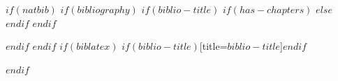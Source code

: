 $if(natbib)$
$if(bibliography)$
$if(biblio-title)$
$if(has-chapters)$
\renewcommand\bibname{$biblio-title$}
$else$
\renewcommand\refname{$biblio-title$}
$endif$
$endif$


$endif$
$endif$
$if(biblatex)$
\printbibliography$if(biblio-title)$[title=$biblio-title$]$endif$

$endif$
